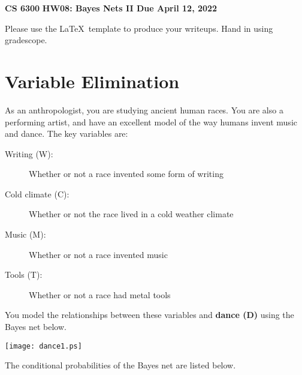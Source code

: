\documentclass[12pt]{article}
\begin{document}
\begin{center}
{\bf CS 6300} \hfill {\large\bf HW08: Bayes Nets II \hfill Due April 12, 2022}
\end{center}

\noindent
Please use the \LaTeX\ template to produce your writeups.  Hand in
using gradescope.

\section{Variable Elimination}

As an anthropologist, you are studying ancient human races.  You are
also a performing artist, and have an excellent model of the way
humans invent music and dance.  The key variables are:

\begin{description}

\item[Writing (W):] Whether or not a race invented some form of writing

\item[Cold climate (C):] Whether or not the race lived in a cold weather climate

\item[Music (M):] Whether or not a race invented music

\item[Tools (T):] Whether or not a race had metal tools

\end{description}

\noindent
You model the relationships between these variables and {\bf dance (D)}
using the Bayes net below.

\begin{center}
\texttt{[image: dance1.ps]}
\end{center}

\noindent
The conditional probabilities of the Bayes net are listed below.
\end{document}
